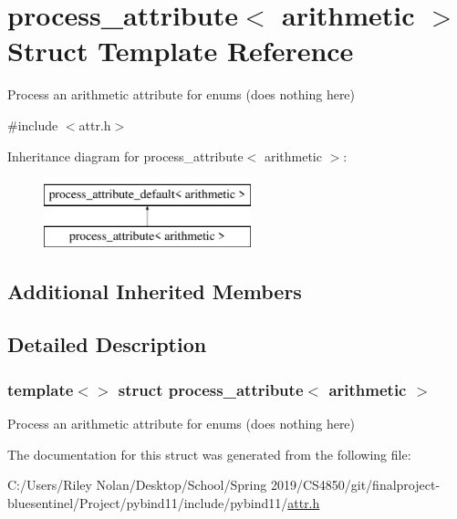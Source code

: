 \hypertarget{structprocess__attribute_3_01arithmetic_01_4}{}\section{process\+\_\+attribute$<$ arithmetic $>$ Struct Template Reference}
\label{structprocess__attribute_3_01arithmetic_01_4}


Process an \textquotesingle{}arithmetic\textquotesingle{} attribute for enums (does nothing here)  




{\ttfamily \#include $<$attr.\+h$>$}

Inheritance diagram for process\+\_\+attribute$<$ arithmetic $>$\+:\begin{figure}[H]
\begin{center}
\leavevmode
\includegraphics[height=2.000000cm]{structprocess__attribute_3_01arithmetic_01_4}
\end{center}
\end{figure}
\subsection*{Additional Inherited Members}


\subsection{Detailed Description}
\subsubsection*{template$<$$>$\newline
struct process\+\_\+attribute$<$ arithmetic $>$}

Process an \textquotesingle{}arithmetic\textquotesingle{} attribute for enums (does nothing here) 

The documentation for this struct was generated from the following file\+:\begin{DoxyCompactItemize}
\item 
C\+:/\+Users/\+Riley Nolan/\+Desktop/\+School/\+Spring 2019/\+C\+S4850/git/finalproject-\/bluesentinel/\+Project/pybind11/include/pybind11/\mbox{\hyperlink{attr_8h}{attr.\+h}}\end{DoxyCompactItemize}
